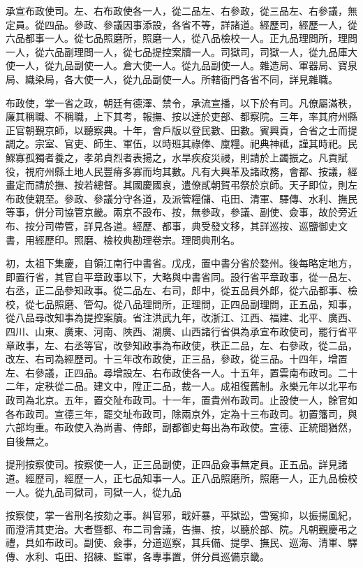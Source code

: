 承宣布政使司。左、右布政使各一人，從二品左、右參政，從三品左、右參議，無定員。從四品。參政、參議因事添設，各省不等，詳諸道。經歷司，經歷一人，從六品都事一人。從七品照磨所，照磨一人，從八品檢校一人。正九品理問所，理問一人，從六品副理問一人，從七品提控案牘一人。司獄司，司獄一人，從九品庫大使一人，從九品副使一人。倉大使一人。從九品副使一人。雜造局、軍器局、寶泉局、織染局，各大使一人，從九品副使一人。所轄衙門各省不同，詳見雜職。

布政使，掌一省之政，朝廷有德澤、禁令，承流宣播，以下於有司。凡僚屬滿秩，廉其稱職、不稱職，上下其考，報撫、按以達於吏部、都察院。三年，率其府州縣正官朝覲京師，以聽察典。十年，會戶版以登民數、田數。賓興貢，合省之士而提調之。宗室、官吏、師生、軍伍，以時班其祿俸、廩糧。祀典神祗，謹其時祀。民鰥寡孤獨者養之，孝弟貞烈者表揚之，水旱疾疫災祲，則請於上蠲振之。凡貢賦役，視府州縣土地人民豐瘠多寡而均其數。凡有大興革及諸政務，會都、按議，經畫定而請於撫、按若總督。其國慶國哀，遣僚貳朝賀弔祭於京師。天子即位，則左布政使親至。參政、參議分守各道，及派管糧儲、屯田、清軍、驛傳、水利、撫民等事，併分司協管京畿。兩京不設布、按，無參政，參議、副使、僉事，故於旁近布、按分司帶管，詳見各道。經歷、都事，典受發文移，其詳巡按、巡鹽御史文書，用經歷印。照磨、檢校典勘理卷宗。理問典刑名。

初，太祖下集慶，自領江南行中書省。戊戌，置中書分省於婺州。後每略定地方，即置行省，其官自平章政事以下，大略與中書省同。設行省平章政事，從一品左、右丞，正二品參知政事。從二品左、右司，郎中，從五品員外郎，從六品都事、檢校，從七品照磨、管勾。從八品理問所，正理問，正四品副理問，正五品，知事，從八品尋改知事為提控案牘。省注洪武九年，改浙江、江西、福建、北平、廣西、四川、山東、廣東、河南、陜西、湖廣、山西諸行省俱為承宣布政使司，罷行省平章政事，左、右丞等官，改參知政事為布政使，秩正二品，左、右參政，從二品，改左、右司為經歷司。十三年改布政使，正三品，參政，從三品。十四年，增置左、右參議，正四品。尋增設左、右布政使各一人。十五年，置雲南布政司。二十二年，定秩從二品。建文中，陞正二品，裁一人。成祖復舊制。永樂元年以北平布政司為北京。五年，置交阯布政司。十一年，置貴州布政司。止設使一人，餘官如各布政司。宣德三年，罷交址布政司，除兩京外，定為十三布政司。初置籓司，與六部均重。布政使入為尚書、侍郎，副都御史每出為布政使。宣德、正統間猶然，自後無之。

提刑按察使司。按察使一人，正三品副使，正四品僉事無定員。正五品。詳見諸道。經歷司，經歷一人，正七品知事一人。正八品照磨所，照磨一人，正九品檢校一人。從九品司獄司，司獄一人，從九品

按察使，掌一省刑名按劾之事。糾官邪，戢奸暴，平獄訟，雪冤抑，以振揚風紀，而澄清其吏治。大者暨都、布二司會議，告撫、按，以聽於部、院。凡朝覲慶弔之禮，具如布政司。副使、僉事，分道巡察，其兵備、提學、撫民、巡海、清軍、驛傳、水利、屯田、招練、監軍，各專事置，併分員巡備京畿。

